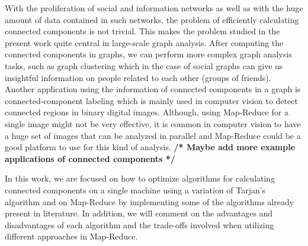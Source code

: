 With the proliferation of social and information networks as well as with the huge amount of data contained in such networks, the problem of efficiently calculating connected components is not trivial. This makes the problem studied in the present work quite central in large-scale graph analysis. After computing the connected components in graphs, we can perform more complex graph analysis tasks, such as graph clustering which in the case of social graphs can give us insightful information on people related to each other (\eg groups of friends). Another application using the information of connected components in a graph is connected-component labeling which is mainly used in computer vision to detect connected regions in binary digital images. Although, using Map-Reduce for a single image might not be very effective, it is common in computer vision to have a huge set of images that can be analyzed in parallel and Map-Reduce could be a good platform to use for this kind of analysis. \textbf{/* Maybe add more example applications of connected components */}

In this work, we are focused on how to optimize algorithms for calculating connected components on a single machine using a variation of Tarjan's algorithm and on Map-Reduce by implementing some of the algorithms already present in literature. In addition, we will comment on the advantages and disadvantages of each algorithm and the trade-offs involved when utilizing different approaches in Map-Reduce.

